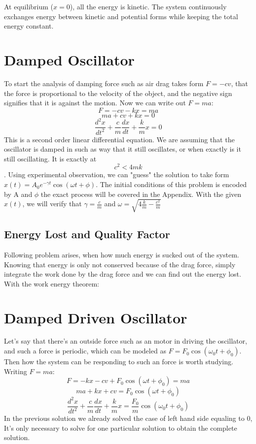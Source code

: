 \documentclass[11pt]{article}
\begin{document}
   At equilibrium ($x = 0$), all the energy is kinetic. The system continuously exchanges energy between kinetic and potential forms while keeping the total energy constant.
 \section{Damped Oscillator }
 
 	To start the analysis of damping force such as air drag takes form $F=-cv$, that the force is proportional to the velocity of the object, and the negative sign signifies that it is against the motion. Now we can write out $F=ma$:
 	\[F = -cv-kx = ma\]
 	\[ma + cv+kx = 0\]
 	\[\frac{d^2x}{dt^2}  + \frac{c}{m} \frac{dx}{dt} + \frac{k}{m} x = 0\]
 	This is a second order linear differential equation. We are assuming that the oscillator is damped in such as way that it still oscillates, or when exactly is it still oscillating. It is exactly at \[c^2<4mk\].  Using experimental observation, we can "guess" the solution to take form $x(t) = A_0 e^{-\gamma t} \cos(\omega t + \phi) $. The initial conditions of this problem is encoded by A and $\phi$ the exact process will be covered in the Appendix.
 	With the given $x(t)$, we will verify that $\gamma = \frac{c}{m}$ and $\omega = \sqrt{4\frac{k}{m}-\frac{c^2}{m}}$
 	\subsection{Energy Lost and Quality Factor}
 	Following problem arises, when how much energy is sucked out of the system. Knowing that energy is only not conserved because of the drag force, simply integrate the work done by the drag force and we can find out the energy lost. With the work energy theorem: 
 	
 	
 \section{Damped Driven Oscillator}
 	Let's say that there's an outside force such as an motor in driving the oscillator, and such a force is periodic, which can be modeled as $F = F_0\cos(\omega_0 t + \phi_0)$. Then how the system can be responding to such an force is worth studying. Writing $F = ma$:
 	\[F = -kx-cv+F_0\cos(\omega t + \phi_0) = ma\]
 	\[ma+kx+cv = F_0\cos(\omega t + \phi_0)\]
 	\[\frac{d^2x}{dt^2}  + \frac{c}{m} \frac{dx}{dt} + \frac{k}{m} x = \frac{F_0}{m}\cos(\omega_0 t + \phi_0)\]
 	In the previous solution we already solved the case of left hand side equaling to 0, It's only necessary to solve for one particular solution to obtain the complete solution. 
 	
\end{document}
